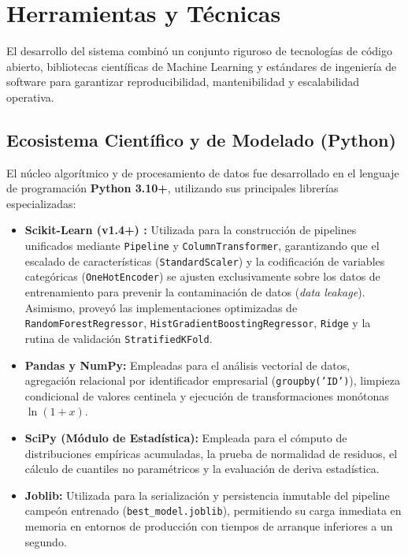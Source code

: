 \section{Herramientas y Técnicas}
\label{sec:herramientas}

El desarrollo del sistema combinó un conjunto riguroso de tecnologías de código abierto, bibliotecas científicas de Machine Learning y estándares de ingeniería de software para garantizar reproducibilidad, mantenibilidad y escalabilidad operativa.

\subsection{Ecosistema Científico y de Modelado (Python)}
El núcleo algorítmico y de procesamiento de datos fue desarrollado en el lenguaje de programación \textbf{Python 3.10+}, utilizando sus principales librerías especializadas:
\begin{itemize}
    \item \textbf{Scikit-Learn (v1.4+) \citep{pedregosa2011scikit}:} Utilizada para la construcción de pipelines unificados mediante \texttt{Pipeline} y \texttt{ColumnTransformer}, garantizando que el escalado de características (\texttt{StandardScaler}) y la codificación de variables categóricas (\texttt{OneHotEncoder}) se ajusten exclusivamente sobre los datos de entrenamiento para prevenir la contaminación de datos (\textit{data leakage}). Asimismo, proveyó las implementaciones optimizadas de \texttt{RandomForestRegressor}, \texttt{HistGradientBoostingRegressor}, \texttt{Ridge} y la rutina de validación \texttt{StratifiedKFold}.
    \item \textbf{Pandas y NumPy:} Empleadas para el análisis vectorial de datos, agregación relacional por identificador empresarial (\texttt{groupby('ID')}), limpieza condicional de valores centinela y ejecución de transformaciones monótonas $\ln(1+x)$.
    \item \textbf{SciPy (Módulo de Estadística):} Empleada para el cómputo de distribuciones empíricas acumuladas, la prueba de normalidad de residuos, el cálculo de cuantiles no paramétricos y la evaluación de deriva estadística.
    \item \textbf{Joblib:} Utilizada para la serialización y persistencia inmutable del pipeline campeón entrenado (\texttt{best\_model.joblib}), permitiendo su carga inmediata en memoria en entornos de producción con tiempos de arranque inferiores a un segundo.
\end{itemize}

